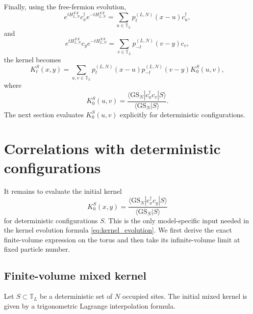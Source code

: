 \documentclass[11pt]{article}
\numberwithin{equation}{section}
\newcommand{\1}{\mathbf 1}
\begin{document}
Finally, using the free-fermion evolution,
\[
    e^{tH^{XX}_{L,N}}c_x^\dagger e^{-tH^{XX}_{L,N}}
    =
    \sum_{u\in\mathbb T_L}p_t^{(L,N)}(x-u)c_u^\dagger,
\]
and
\[
    e^{tH^{XX}_{L,N}}c_y e^{-tH^{XX}_{L,N}}
    =
    \sum_{v\in\mathbb T_L}p_{-t}^{(L,N)}(v-y)c_v,
\]
the kernel becomes
\begin{equation}
    K_t^S(x,y)
    =
    \sum_{u,v\in\mathbb T_L}
    p_t^{(L,N)}(x-u)
    p_{-t}^{(L,N)}(v-y)
    K^S_0(u,v),
    \label{eq:kernel_evolution}
\end{equation}
where
\begin{equation}
    K^S_0(u,v)
    =
    \frac{
    \langle \mathrm{GS}_N|c_u^\dagger c_v|S\rangle
    }{
    \langle \mathrm{GS}_N|S\rangle
    }.
    \label{eq:initial_mixed_kernel}
\end{equation}
The next section evaluates \(K^S_0(u,v)\) explicitly for deterministic
configurations.


\section{Correlations with deterministic configurations}
\label{sec:mixed_correlations}

It remains to evaluate the initial kernel
\[
    K^S_0(x,y)
    =
    \frac{\langle \mathrm{GS}_N|c_x^\dagger c_y|S\rangle}
    {\langle \mathrm{GS}_N|S\rangle}
\]
for deterministic configurations \(S\). This is the only model-specific input
needed in the kernel evolution formula \eqref{eq:kernel_evolution}. We first
derive the exact finite-volume expression on the torus and then take its
infinite-volume limit at fixed particle number.

\subsection{Finite-volume mixed kernel}

Let \(S\subset\mathbb T_L\) be a deterministic set of \(N\) occupied sites.
The initial mixed kernel is given by a trigonometric Lagrange interpolation
formula.
\end{document}

